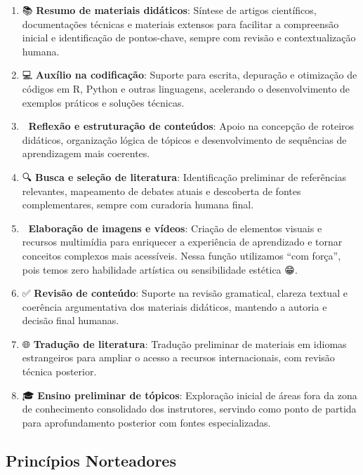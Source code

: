 \documentclass[
  a4paper,
]{book}
\newcommand{\emojitext}[1]{{\emoji #1}}
\begin{document}
\begin{enumerate}
\def\labelenumi{\arabic{enumi}.}
\item
  \emojitext{📚} \textbf{Resumo de materiais didáticos}: Síntese de
  artigos científicos, documentações técnicas e materiais extensos para
  facilitar a compreensão inicial e identificação de pontos-chave,
  sempre com revisão e contextualização humana.
\item
  \emojitext{💻} \textbf{Auxílio na codificação}: Suporte para escrita,
  depuração e otimização de códigos em R, Python e outras linguagens,
  acelerando o desenvolvimento de exemplos práticos e soluções técnicas.
\item
  \emojitext{🧭} \textbf{Reflexão e estruturação de conteúdos}: Apoio na
  concepção de roteiros didáticos, organização lógica de tópicos e
  desenvolvimento de sequências de aprendizagem mais coerentes.
\item
  \emojitext{🔍} \textbf{Busca e seleção de literatura}: Identificação
  preliminar de referências relevantes, mapeamento de debates atuais e
  descoberta de fontes complementares, sempre com curadoria humana
  final.
\item
  \emojitext{🎨} \textbf{Elaboração de imagens e vídeos}: Criação de
  elementos visuais e recursos multimídia para enriquecer a experiência
  de aprendizado e tornar conceitos complexos mais acessíveis. Nessa
  função utilizamos ``com força'', pois temos zero habilidade artística
  ou sensibilidade estética \emojitext{😁}.
\item
  \emojitext{✅} \textbf{Revisão de conteúdo}: Suporte na revisão
  gramatical, clareza textual e coerência argumentativa dos materiais
  didáticos, mantendo a autoria e decisão final humanas.
\item
  \emojitext{🌐} \textbf{Tradução de literatura}: Tradução preliminar de
  materiais em idiomas estrangeiros para ampliar o acesso a recursos
  internacionais, com revisão técnica posterior.
\item
  \emojitext{🎓} \textbf{Ensino preliminar de tópicos}: Exploração
  inicial de áreas fora da zona de conhecimento consolidado dos
  instrutores, servindo como ponto de partida para aprofundamento
  posterior com fontes especializadas.
\end{enumerate}

\subsection{Princípios Norteadores}\label{princuxedpios-norteadores}
\end{document}
